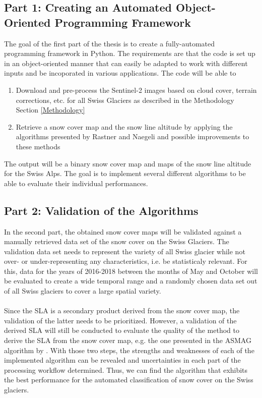 \documentclass[12pt]{article}
\begin{document}
\subsection{Part 1: Creating an Automated Object-Oriented Programming Framework}
The goal of the first part of the thesis is to create a fully-automated programming framework in Python. The requirements are that the code is set up in an object-oriented manner that can easily be adapted to work with different inputs and be incoporated in various applications. The code will be able to\\
\begin{enumerate}
\item Download and pre-process the Sentinel-2 images based on cloud cover, terrain corrections, etc. for all Swiss Glaciers as described in the Methodology Section \ref{Methodology}
\item Retrieve a snow cover map and the snow line altitude by applying the algorithms presented by Rastner and Naegeli and possible improvements to these methods
\end{enumerate}

The output will be a binary snow cover map and maps of the snow line altitude for the Swiss Alps. The goal is to implement several different algorithms to be able to evaluate their individual performances.


\subsection{Part 2: Validation of the Algorithms}
In the second part, the obtained snow cover maps will be validated against a manually retrieved data set of the snow cover on the Swiss Glaciers. The validation data set needs to represent the variety of all Swiss glacier while not over- or under-representing any characteristics, i.e. be statisticaly relevant. For this, data for the years of 2016-2018 between the months of May and October will be evaluated to create a wide temporal range and a randomly chosen data set out of all Swiss glaciers to cover a large spatial variety. \\
\\
Since the SLA is a secondary product derived from the snow cover map, the validation of the latter needs to be prioritized. However, a validation of the derived SLA will still be conducted to evaluate the quality of the method to derive the SLA from the snow cover map, e.g. the one presented in the ASMAG algorithm by \cite{Rastner2017}. With those two steps, the strengths and weaknesses of each of the implemented algorithm can be revealed and uncertainties in each  part of the processing workflow determined. Thus, we can find the algorithm that exhibits the best performance for the automated classification of snow cover on the Swiss glaciers. 
\end{document}
